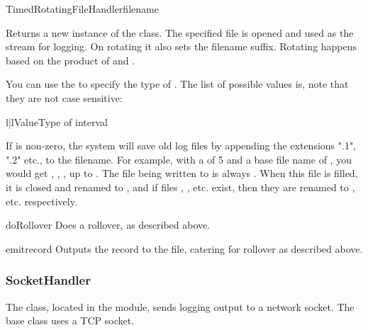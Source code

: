 \begin{classdesc}{TimedRotatingFileHandler}{filename
                                            }

Returns a new instance of the  class. The
specified file is opened and used as the stream for logging. On rotating
it also sets the filename suffix. Rotating happens based on the product
of  and .

You can use the  to specify the type of . The
list of possible values is, note that they are not case sensitive:

\begin{tableii}{l|l}{}{Value}{Type of interval}
\end{tableii}

If  is non-zero, the system will save old log files by
appending the extensions ".1", ".2" etc., to the filename. For example,
with a  of 5 and a base file name of ,
you would get , , , up to
. The file being written to is always .
When this file is filled, it is closed and renamed to ,
and if files , , etc. exist, then they
are renamed to ,  etc. respectively.
\end{classdesc}

\begin{methoddesc}{doRollover}{}
Does a rollover, as described above.
\end{methoddesc}

\begin{methoddesc}{emit}{record}
Outputs the record to the file, catering for rollover as described
above.
\end{methoddesc}

\subsubsection{SocketHandler}

The  class, located in the
 module, sends logging output to a network
socket. The base class uses a TCP socket.

